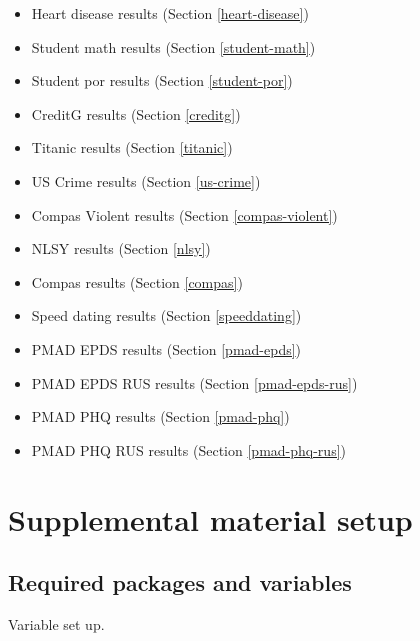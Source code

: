 \documentclass[
]{book}
\providecommand{\tightlist}{%
  \setlength{\itemsep}{0pt}\setlength{\parskip}{0pt}}
\begin{document}
\begin{itemize}
\tightlist
\item
  Heart disease results (Section \ref{heart-disease})
\item
  Student math results (Section \ref{student-math})
\item
  Student por results (Section \ref{student-por})
\item
  CreditG results (Section \ref{creditg})
\item
  Titanic results (Section \ref{titanic})
\item
  US Crime results (Section \ref{us-crime})
\item
  Compas Violent results (Section \ref{compas-violent})
\item
  NLSY results (Section \ref{nlsy})
\item
  Compas results (Section \ref{compas})
\item
  Speed dating results (Section \ref{speeddating})
\item
  PMAD EPDS results (Section \ref{pmad-epds})
\item
  PMAD EPDS RUS results (Section \ref{pmad-epds-rus})
\item
  PMAD PHQ results (Section \ref{pmad-phq})
\item
  PMAD PHQ RUS results (Section \ref{pmad-phq-rus})
\end{itemize}

\hypertarget{supplemental-material-setup}{%
\section{Supplemental material setup}\label{supplemental-material-setup}}

\hypertarget{required-packages-and-variables}{%
\subsection{Required packages and variables}\label{required-packages-and-variables}}

Variable set up.
\end{document}
